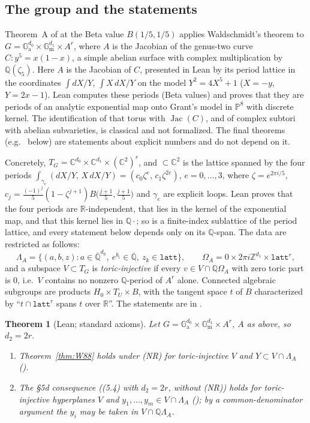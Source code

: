 \documentclass[11pt]{amsart}
\newtheorem{theorem}{Theorem}[section]
\theoremstyle{definition}
\theoremstyle{remark}
\numberwithin{equation}{section}
\newcommand{\ZZ}{\mathbb{Z}}
\newcommand{\QQ}{\mathbb{Q}}
\newcommand{\RR}{\mathbb{R}}
\newcommand{\CC}{\mathbb{C}}
\newcommand{\PP}{\mathbb{P}}
\newcommand{\Qbar}{\overline{\mathbb{Q}}}
\newcommand{\Ga}{\mathbb{G}_{\mathrm{a}}}
\newcommand{\Gm}{\mathbb{G}_{\mathrm{m}}}
\newcommand{\NR}{\textup{(NR)}}
\begin{document}
\subsection{The group and the statements}
Theorem~A of \cite{Note} at the Beta value $B(1/5,1/5)$ applies Waldschmidt's theorem to
$G=\Ga^{d_0}\times\Gm^{d_1}\times A^r$, where $A$ is the Jacobian of the genus-two curve
$C\colon y^5=x(1-x)$, a simple abelian surface with complex multiplication by $\QQ(\zeta_5)$. Here $A$ is the
Jacobian of $C$, presented in Lean by its period lattice in the coordinates $\int dX/Y$, $\int X\,dX/Y$ on the
model $Y^2=4X^5+1$ ($X=-y$, $Y=2x-1$). Lean computes these periods (Beta values) and proves that they are
periods of an analytic exponential map onto Grant's model in $\PP^8$ with discrete kernel. The
identification of that torus with $\operatorname{Jac}(C)$, and of complex subtori with abelian subvarieties,
is classical and not formalized. The final theorems (e.g.\  below) are statements
about explicit numbers and do not depend on it.

Concretely, $T_G=\CC^{d_0}\times\CC^{d_1}\times(\CC^2)^r$, and ${}\subset\CC^2$ is the lattice spanned by
the four periods $\int_{\gamma_e}(dX/Y,\,X\,dX/Y)=(c_0\zeta^e,\,c_1\zeta^{2e})$, $e=0,\dots,3$, where $\zeta=e^{2\pi i/5}$,
$c_j=\frac{(-1)^j}5(1-\zeta^{j+1})B\bigl(\frac{j+1}5,\frac{j+1}5\bigr)$ and $\gamma_e$ are explicit loops. Lean proves
that the four periods are $\RR$-independent, that  lies in the kernel of the exponential map, and that
this kernel lies in $\QQ\cdot$; so  is a finite-index sublattice of the period lattice, and
every statement below depends only on its $\QQ$-span. The data are restricted as follows:
\[
\Lambda_A=\{(a,b,z): a\in\Qbar^{d_0},\ e^{b_i}\in\Qbar,\ z_k\in\texttt{latt}\},\qquad
\Omega_A=0\times2\pi i\ZZ^{d_1}\times\texttt{latt}^r ,
\]
and a subspace $V\subset T_G$ is \emph{toric-injective} if every $v\in V\cap\QQ\Omega_A$ with zero toric part is
$0$, i.e.\ $V$ contains no nonzero $\QQ$-period of $A^r$ alone. Connected algebraic subgroups are products
$H_0\times T_U\times B$, with the tangent space $t$ of $B$ characterized by ``$t\cap\texttt{latt}^r$ spans $t$
over $\RR$''. The statements are in .

\begin{theorem}[Lean; standard axioms]\label{thm:abvar}
Let $G=\Ga^{d_0}\times\Gm^{d_1}\times A^r$, $A$ as above, so $d_2=2r$.
\begin{enumerate}
\item[(a)] Theorem~\ref{thm:W88} holds under \NR{} for toric-injective $V$ and $Y\subset V\cap\Lambda_A$
().
\item[(b)] The \S5d consequence ((5.4) with $d_2=2r$, without \NR) holds for toric-injective hyperplanes $V$
and $y_1,\dots,y_m\in V\cap\Lambda_A$ (); by a common-denominator argument
the $y_i$ may be taken in $V\cap\QQ\Lambda_A$.
\end{enumerate}
\end{theorem}
\end{document}
